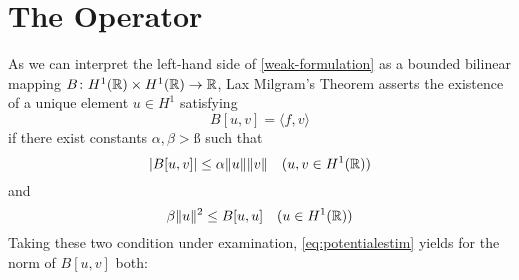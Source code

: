 \chapter{The Operator}

As we can interpret the left-hand side of \eqref{weak-formulation} as a bounded bilinear mapping $B \colon H^{1}(\mathbb{R}) \times H^{1}(\mathbb{R}) \rightarrow \mathbb{R}$, Lax Milgram's Theorem asserts the existence of a unique element $u \in H^{1}$ satisfying
\begin{equation*}
	B[u, v] = \langle f, v \rangle
\end{equation*}
if there exist constants $\alpha, \beta > ß$ such that
	\[ \left| B[u,v] \right| \leq \alpha \|u\| \|v\| \quad (u, v \in H^{1}(\mathbb{R})) \]
and
	\[ \beta \|u\|^{2} \leq B[u, u] \quad (u \in H^{1}(\mathbb{R})) \]
Taking these two condition under examination, \eqref{eq:potentialestim} yields for the norm of $B[u, v]$ both: \newpage %

